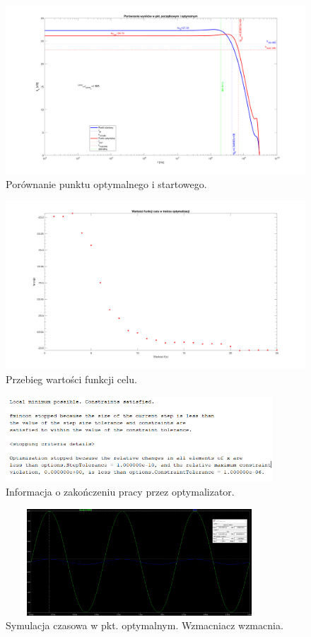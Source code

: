 \documentclass{article}
\begin{document}
\begin{figure}[h]
	\includegraphics[width=12cm]{graphics/comparison.png}
	\centering
	\caption{Porównanie punktu optymalnego i startowego.}
\end{figure}

\begin{figure}[h]
	\includegraphics[width=12cm]{graphics/fval.png}
	\centering
	\caption{Przebieg wartości funkcji celu.}
\end{figure}

\begin{figure}[h]
	\includegraphics[width=10cm]{graphics/exit_msg.png}
	\centering
	\caption{Informacja o zakończeniu pracy przez optymalizator.}
\end{figure}


\begin{figure}[h]
	\includegraphics[width=10cm,height=4cm]{graphics/optim_tran.png}
	\centering
	\caption{Symulacja czasowa w pkt. optymalnym. Wzmacniacz wzmacnia.}
\end{figure}
\end{document}
